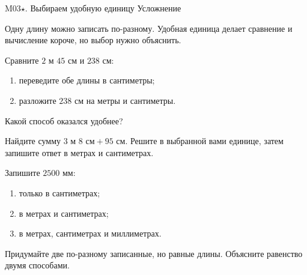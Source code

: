 \worksheettitle
  {M03\(\star\). Выбираем удобную единицу}
  { Усложнение}

\studentnameblock

\begin{notebox}
  Одну длину можно записать по-разному. Удобная единица делает сравнение и
  вычисление короче, но выбор нужно объяснить.
\end{notebox}

\begin{practicebox}
  Сравните $2\text{ м }45\text{ см}$ и $238\text{ см}$:
  \begin{enumerate}[label=\alph*)]
    \item переведите обе длины в сантиметры;
    \item разложите $238$ см на метры и сантиметры.
  \end{enumerate}
  Какой способ оказался удобнее? 
\end{practicebox}

\begin{practicebox}
  Найдите сумму $3\text{ м }8\text{ см}+95\text{ см}$. Решите в выбранной
  вами единице, затем запишите ответ в метрах и сантиметрах.
\end{practicebox}

\begin{practicebox}
  Запишите $2500$ мм:
  \begin{enumerate}[label=\alph*)]
    \item только в сантиметрах;
    \item в метрах и сантиметрах;
    \item в метрах, сантиметрах и миллиметрах.
  \end{enumerate}
\end{practicebox}

\begin{checkpointbox}[Исследование]
  Придумайте две по-разному записанные, но равные длины. Объясните равенство
  двумя способами. 
\end{checkpointbox}
